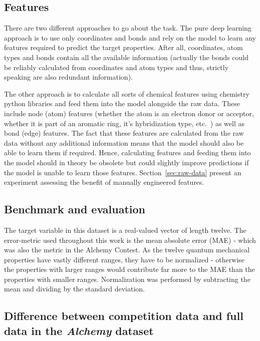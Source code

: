 

\subsection{Features}
\label{sec:features}

There are two different approaches to go about the task. The pure deep learning approach is to use only coordinates and bonds and rely on the model to learn any features required to predict the target properties. After all, coordinates, atom types and bonds contain all the available information (actually the bonds could be reliably calculated from coordinates and atom types and thus, strictly speaking are also redundant information).

The other approach is to calculate all sorts of chemical features using chemistry python libraries and feed them into the model alongside the raw data. These include node (atom) features (whether the atom is an electron donor or acceptor, whether it is part of an aromatic ring, it's hybridization type, etc.~\cite{Organic-chemistry}) as well as bond (edge) features. The fact that these features are calculated from the raw data without any additional information means that the model should also be able to learn them if required. Hence, calculating features and feeding them into the model should in theory be obsolete but could slightly improve predictions if the model is unable to learn those features. Section~\ref{sec:raw-data} present an experiment assessing the benefit of manually engineered features.

\subsection{Benchmark and evaluation}

The target variable in this dataset is a real-valued vector of length twelve. The error-metric used throughout this work is the mean absolute error (MAE) - which was also the metric in the Alchemy Contest. As the twelve quantum mechanical properties have vastly different ranges, they have to be normalized - otherwise the properties with larger ranges would contribute far more to the MAE than the properties with smaller ranges. Normalization was performed by subtracting the mean and dividing by the standard deviation.

\subsection{Difference between competition data and full data in the \textit{Alchemy} dataset}
\label{sec:diff-old-new-ds}

